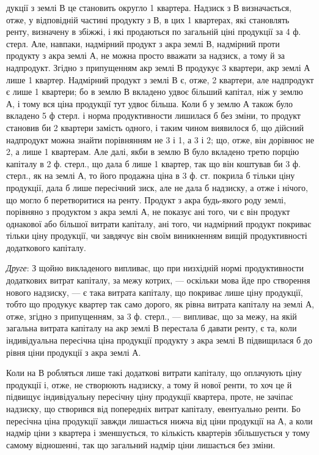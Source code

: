 \parcont{}  %
дукції з землі В це становить округло 1 квартера. Надзиск з В визначається,
отже, у відповідній частині продукту з В, в цих 1 квартерах, які
становлять ренту, визначену в збіжжі, і які продаються по загальній ціні продукції
за 4 ф. стерл. Але, навпаки, надмірний продукт з акра землі В, надмірний
проти продукту з акра землі А, не можна просто вважати за надзиск,
а тому й за надпродукт. Згідно з припущенням акр землі В продукує 3 квартери,
акр землі А лише 1 квартер. Надмірний продукт з землі В є, отже,
2 квартери, але надпродукт є лише 1 квартери; бо в землю В вкладено
удвоє більший капітал, ніж у землю А, і тому вся ціна продукції тут удвоє
більша. Коли б у землю А також було вкладено 5 ф стерл. і норма продуктивности
лишилася б без зміни, то продукт становив би 2 квартери замість одного,
і таким чином виявилося б, що дійсний надпродукт можна знайти порівнянням
не 3 і 1, а 3 і 2; що, отже, він дорівнює не 2, а лише 1 квартерам.
Але далі, якби в землю В було вкладено третю порцію капіталу в 2 ф. стерл.,
що дала б лише 1 квартер, так що він коштував би 3 ф. стерл., як на землі А, то
його продажна ціна в 3 ф. ст. покрила б тільки ціну продукції, дала б лише
пересічний зиск, але не дала б надзиску, а отже і нічого, що могло б перетворитися
на ренту. Продукт з акра будь-якого роду землі, порівняно з продуктом
з акра землі А, не показує ані того, чи є він продукт однакової або більшої
витрати капіталу, ані того, чи надмірний продукт покриває тільки ціну продукції,
чи завдячує він своїм виникненням вищій продуктивності додаткового капіталу.

\emph{Друге}: З щойно викладеного випливає, що при низхідній нормі продуктивности
додаткових витрат капіталу, за межу котрих, — оскільки мова йде
про створення нового надзиску, — є така витрата капіталу, що покриває лише
ціну продукції, тобто що продукує квартер так само дорого, як рівна витрата
капіталу на землі А, отже, згідно з припущенням, за 3 ф. стерл., — випливає,
що за межу, на якій загальна витрата капіталу на акр землі В перестала б
давати ренту, є та, коли індивідуальна пересічна ціна продукції продукту з
акра землі В підвищилася б до рівня ціни продукції з акра землі А.

Коли на В робляться лише такі додаткові витрати капіталу, що оплачують
ціну продукції і, отже, не створюють надзиску, а тому й нової ренти, то хоч
це й підвищує індивідуальну пересічну ціну продукції квартера, проте, не зачіпає
надзиску, що створився від попередніх витрат капіталу, евентуально ренти. Бо
пересічна ціна продукції завжди лишається нижча від ціни продукції на А, а коли
надмір ціни з квартера і зменшується, то кількість квартерів збільшується
у тому самому відношенні, так що загальний надмір ціни лишається без зміни.

